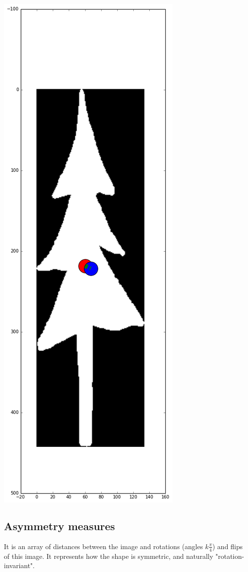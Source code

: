 \documentclass[12pt]{article}
\begin{document}
\includegraphics[scale=0.26]{tree_centroid.png}


\subsection{Asymmetry measures}
It is an array of distances between the image and rotations (angles $k\frac{\pi}{4}$) and flips of this image. It represents how the shape is symmetric, and naturally "rotation-invariant".
 
\end{document}
